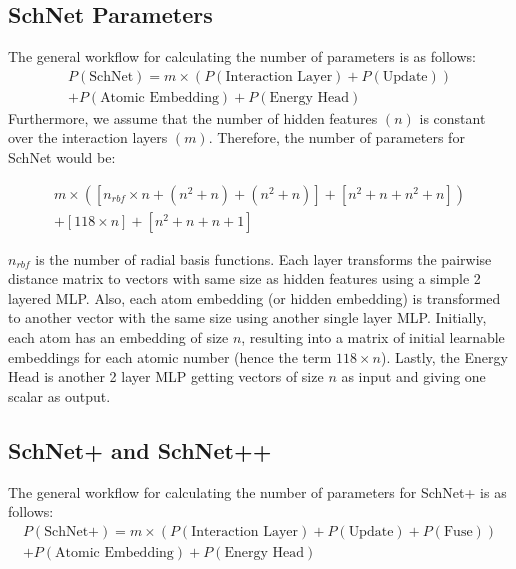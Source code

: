 \documentclass[sigconf, nonacm]{acmart}
\begin{document}
\subsection{SchNet Parameters}
The general workflow for calculating the number of parameters is as follows:
\begin{equation}
	\begin{split}
		P\left(\text{SchNet}\right) = m\times\left(P\left(\text{Interaction Layer}\right) + P\left(\text{Update}\right)\right) \\ + P\left(\text{Atomic Embedding}\right) + P\left(\text{Energy Head}\right)
	\end{split}
\end{equation}
Furthermore, we assume that the number of hidden features $(n)$ is constant over the interaction layers $(m)$. Therefore, the number of parameters for SchNet would be:

\begin{equation}
	\begin{split}
		m\times\left(\left[n_{rbf}\times n + \left(n^2 + n\right) + \left(n^2 + n\right)\right] + \left[n^2 + n + n^2 + n\right]\right) \\ + \left[118\times n\right] + \left[n^2 + n + n + 1\right]
	\end{split}
\end{equation}

$n_{rbf}$ is the number of radial basis functions. Each layer transforms the pairwise distance matrix to vectors with same size as hidden features using a simple 2 layered MLP. Also, each atom embedding (or hidden embedding) is transformed to another vector with the same size using another single layer MLP. Initially, each atom has an embedding of size $n$, resulting into a matrix of initial learnable embeddings for each atomic number (hence the term $118\times n$). Lastly, the Energy Head is another 2 layer MLP getting vectors of size $n$ as input and giving one scalar as output.

\subsection{SchNet+ and SchNet++}
The general workflow for calculating the number of parameters for SchNet+ is as follows:
\begin{equation}
	\begin{split}
		P\left(\text{SchNet+}\right) = m\times\left(P\left(\text{Interaction Layer}\right) + P\left(\text{Update}\right) + P\left(\text{Fuse}\right)\right) \\ + P\left(\text{Atomic Embedding}\right) + P\left(\text{Energy Head}\right)
	\end{split}
\end{equation}
\end{document}

